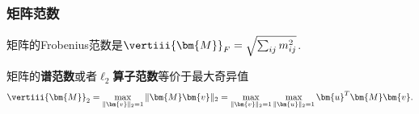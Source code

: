 \subsubsection{矩阵范数}

矩阵的Frobenius范数是$\vertiii{\bm{M}}_F = \sqrt{\sum_{ij} m_{ij}^2}$. 

矩阵的\textbf{谱范数}或者\textbf{$\ell_2$算子范数}等价于最大奇异值
\begin{equation*}
	\vertiii{\bm{M}}_2 
	= \max_{\|\bm{v}\|_2 = 1} \|\bm{M} \bm{v}\|_2
	= \max_{\|\bm{v}\|_2 = 1} \max_{\|\bm{u}\|_2 = 1} \bm{u}^T \bm{M} \bm{v}. 
\end{equation*}



































